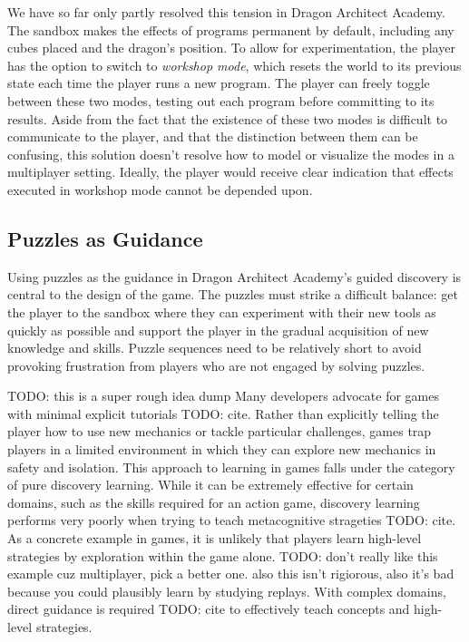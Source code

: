 \documentclass{sig-alternate}
\newcommand{\TODO}[1]{{\color{red} TODO: #1}}
\newcommand{\gametitle}{{\color{RoyalPurple} Dragon Architect Academy}}
\begin{document}
We have so far only partly resolved this tension in \gametitle{}. 
The sandbox makes the effects of programs permanent by default, including any cubes placed and the dragon's position.
To allow for experimentation, the player has the option to switch to \emph{workshop mode}, which resets the world to its previous state each time the player runs a new program. 
The player can freely toggle between these two modes, testing out each program before committing to its results. 
Aside from the fact that the existence of these two modes is difficult to communicate to the player, and that the distinction between them can be confusing, this solution doesn't resolve how to model or visualize the modes in a multiplayer setting. 
Ideally, the player would receive clear indication that effects executed in workshop mode cannot be depended upon.

\subsection{Puzzles as Guidance}
Using puzzles as the guidance in \gametitle{}'s guided discovery is central to the design of the game. 
The puzzles must strike a difficult balance: get the player to the sandbox where they can experiment with their new tools as quickly as possible and support the player in the gradual acquisition of new knowledge and skills. 
Puzzle sequences need to be relatively short to avoid provoking frustration from players who are not engaged by solving puzzles. 

\TODO{this is a super rough idea dump}
Many developers advocate for games with minimal explicit tutorials \TODO{cite}.
Rather than explicitly telling the player how to use new mechanics or tackle particular challenges, games trap players in a limited environment in which they can explore new mechanics in safety and isolation.
This approach to learning in games falls under the category of pure discovery learning.
While it can be extremely effective for certain domains, such as the skills required for an action game, discovery learning performs very poorly when trying to teach metacognitive strageties \TODO{cite}.
As a concrete example in games, it is unlikely that players learn high-level strategies by exploration within the game alone. \TODO{don't really like this example cuz multiplayer, pick a better one. also this isn't rigiorous, also it's bad because you could plausibly learn by studying replays}.
With complex domains, direct guidance is required \TODO{cite} to effectively teach concepts and high-level strategies.
\end{document}
